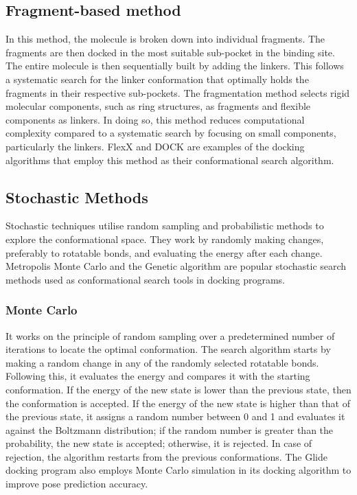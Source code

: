 \documentclass[12pt]{article}
\begin{document}
\subsection{Fragment-based method}

In this method, the molecule is broken down into individual fragments\cite{CH2_sadowski2003conformational}. The fragments are then docked in the most suitable sub-pocket in the binding site. The entire molecule is then sequentially built by adding the linkers. This follows a systematic search for the linker conformation that optimally holds the fragments in their respective sub-pockets. The fragmentation method selects rigid molecular components, such as ring structures, as fragments and flexible components as linkers. In doing so, this method reduces computational complexity compared to a systematic search by focusing on small components, particularly the linkers. FlexX and DOCK are examples of the docking algorithms that employ this method as their conformational search algorithm.

\subsection{Stochastic Methods}
Stochastic techniques utilise random sampling and probabilistic methods to explore the conformational space. They work by randomly making changes, preferably to rotatable bonds, and evaluating the energy after each change. Metropolis Monte Carlo and the Genetic algorithm are popular stochastic search methods used as conformational search tools in docking programs.

\subsubsection{Monte Carlo}

It works on the principle of random sampling over a predetermined number of iterations to locate the optimal conformation\cite{CH2_Metropolis1953}. The search algorithm starts by making a random change in any of the randomly selected rotatable bonds. Following this, it evaluates the energy and compares it with the starting conformation. If the energy of the new state is lower than the previous state, then the conformation is accepted. If the energy of the new state is higher than that of the previous state, it assigns a random number between 0 and 1 and evaluates it against the Boltzmann distribution; if the random number is greater than the probability, the new state is accepted; otherwise, it is rejected. In case of rejection, the algorithm restarts from the previous conformations. The Glide docking program also employs Monte Carlo simulation in its docking algorithm to improve pose prediction accuracy.
\end{document}
